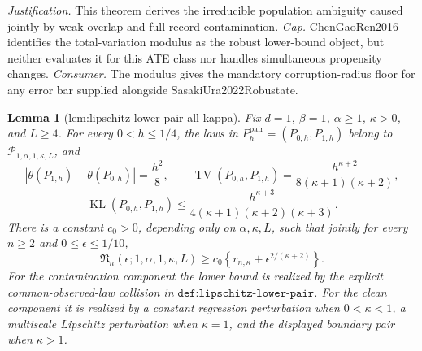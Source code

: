 \documentclass{article}
\newtheorem{lemma}{Lemma}
\begin{document}
\par\smallskip\noindent \textit{Justification.} This theorem derives the irreducible population ambiguity caused jointly by weak overlap and full-record contamination. \textit{Gap.} ChenGaoRen2016 identifies the total-variation modulus as the robust lower-bound object, but neither evaluates it for this ATE class nor handles simultaneous propensity changes. \textit{Consumer.} The modulus gives the mandatory corruption-radius floor for any error bar supplied alongside SasakiUra2022Robustate.

\begin{lemma}[lem:lipschitz-lower-pair-all-kappa]\label{lem:lipschitz-lower-pair-all-kappa}
Fix \(d=1\), \(\beta=1\), \(\alpha\geq1\), \(\kappa>0\), and \(L\geq4\). For every \(0<h\leq1/4\), the laws in \(P_h^{\mathrm{pair}}=(P_{0,h},P_{1,h})\) belong to \(\mathcal P_{1,\alpha,1,\kappa,L}\), and
\[
|\theta(P_{1,h})-\theta(P_{0,h})|=\frac{h^2}{8},
\qquad
\operatorname{TV}(P_{0,h},P_{1,h})
=\frac{h^{\kappa+2}}{8(\kappa+1)(\kappa+2)},
\]
\[
\operatorname{KL}(P_{0,h},P_{1,h})
\leq\frac{h^{\kappa+3}}
{4(\kappa+1)(\kappa+2)(\kappa+3)}.
\]
There is a constant \(c_0>0\), depending only on \(\alpha,\kappa,L\), such that jointly for every \(n\geq2\) and \(0\leq\epsilon\leq1/10\),
\[
\mathfrak R_n(\epsilon;1,\alpha,1,\kappa,L)
\geq c_0\left\{r_{n,\kappa}+\epsilon^{2/(\kappa+2)}\right\}.
\]
For the contamination component the lower bound is realized by the explicit common-observed-law collision in \(\texttt{def:lipschitz-lower-pair}\). For the clean component it is realized by a constant regression perturbation when \(0<\kappa<1\), a multiscale Lipschitz perturbation when \(\kappa=1\), and the displayed boundary pair when \(\kappa>1\).
\end{lemma}
\end{document}
